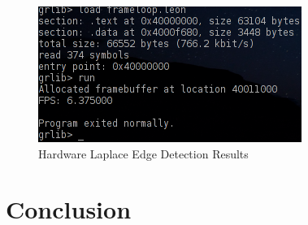 \documentclass{article}
\begin{document}
	 \begin{figure}[H]
	 	\begin{center}
	 		\includegraphics[scale=0.6]{../part7_files/Hardware_Laplace_edge_detection_performance.png}
	 		\caption{Hardware Laplace Edge Detection Results}
	 	\end{center}
	 \end{figure}



\section{Conclusion}




%

%

\end{document}
